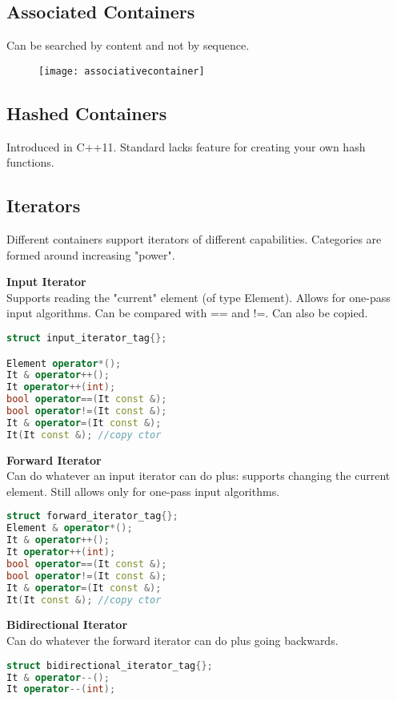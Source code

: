 
\subsection{Associated Containers}
Can be searched by content and not by sequence. 

\begin{figure}[h!]
  \centering
  \texttt{[image: associativecontainer]}
  \caption{}
\end{figure}


\subsection{Hashed Containers}
Introduced in C++11. Standard lacks feature for creating your own hash functions. 

\subsection{Iterators}
Different containers support iterators of different capabilities. Categories are formed around increasing "power".

\textbf{Input Iterator} \\
Supports reading the "current" element (of type Element). Allows for one-pass input algorithms.  Can be compared with == and !=. Can also be copied.

\begin{lstlisting}[language=C++]
struct input_iterator_tag{};

Element operator*();
It & operator++(); 
It operator++(int); 
bool operator==(It const &); 
bool operator!=(It const &); 
It & operator=(It const &); 
It(It const &); //copy ctor
\end{lstlisting}

\textbf{Forward Iterator} \\
Can do whatever an input iterator can do plus: supports changing the current element. Still allows only for one-pass input algorithms.
\begin{lstlisting}[language=C++]
struct forward_iterator_tag{};
Element & operator*(); 
It & operator++(); 
It operator++(int); 
bool operator==(It const &); 
bool operator!=(It const &); 
It & operator=(It const &); 
It(It const &); //copy ctor
\end{lstlisting} 

\textbf{Bidirectional Iterator}\\
Can do whatever the forward iterator can do plus going backwards.
\begin{lstlisting}[language=C++]
struct bidirectional_iterator_tag{};
It & operator--(); 
It operator--(int); 
\end{lstlisting}

